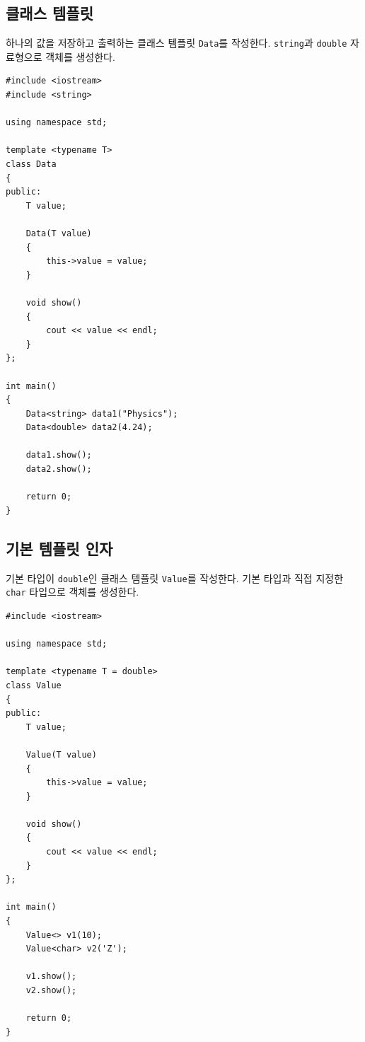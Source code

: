 \documentclass[11pt,a4paper]{article}
\begin{document}
\subsection{클래스 템플릿}
\begin{practicebox}
하나의 값을 저장하고 출력하는 클래스 템플릿 \texttt{Data}를 작성한다. \texttt{string}과 \texttt{double} 자료형으로 객체를 생성한다.
\end{practicebox}

\begin{lstlisting}
#include <iostream>
#include <string>

using namespace std;

template <typename T>
class Data
{
public:
    T value;

    Data(T value)
    {
        this->value = value;
    }

    void show()
    {
        cout << value << endl;
    }
};

int main()
{
    Data<string> data1("Physics");
    Data<double> data2(4.24);

    data1.show();
    data2.show();

    return 0;
}
\end{lstlisting}

\subsection{기본 템플릿 인자}
\begin{practicebox}
기본 타입이 \texttt{double}인 클래스 템플릿 \texttt{Value}를 작성한다. 기본 타입과 직접 지정한 \texttt{char} 타입으로 객체를 생성한다.
\end{practicebox}

\begin{lstlisting}
#include <iostream>

using namespace std;

template <typename T = double>
class Value
{
public:
    T value;

    Value(T value)
    {
        this->value = value;
    }

    void show()
    {
        cout << value << endl;
    }
};

int main()
{
    Value<> v1(10);
    Value<char> v2('Z');

    v1.show();
    v2.show();

    return 0;
}
\end{lstlisting}
\end{document}
